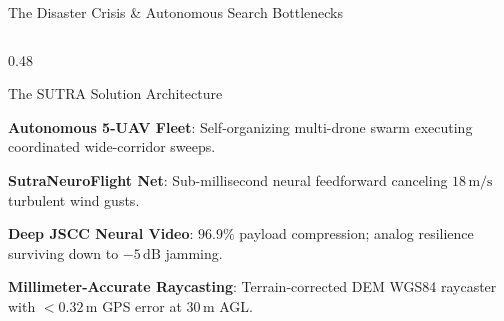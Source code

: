 \documentclass[aspectratio=169, 10pt]{beamer}
\begin{document}
\begin{frame}{The Disaster Crisis \& Autonomous Search Bottlenecks}
\begin{columns}[T]
    \begin{column}{0.48\textwidth}
      \begin{defensecard}{The SUTRA Solution Architecture}
        \begin{itemize}\setlength{\itemsep}{3pt}
          {\tiny
            \item \textbf{Autonomous 5-UAV Fleet}: Self-organizing multi-drone swarm executing coordinated wide-corridor sweeps.
            \item \textbf{SutraNeuroFlight Net}: Sub-millisecond neural feedforward canceling $18\,\text{m/s}$ turbulent wind gusts.
            \item \textbf{Deep JSCC Neural Video}: $96.9\%$ payload compression; analog resilience surviving down to $-5\,\text{dB}$ jamming.
            \item \textbf{Millimeter-Accurate Raycasting}: Terrain-corrected DEM WGS84 raycaster with $< 0.32\,\text{m}$ GPS error at $30\,\text{m}$ AGL.
          }
        \end{itemize}
      \end{defensecard}
    \end{column}
  \end{columns}
\end{frame}

\end{document}
